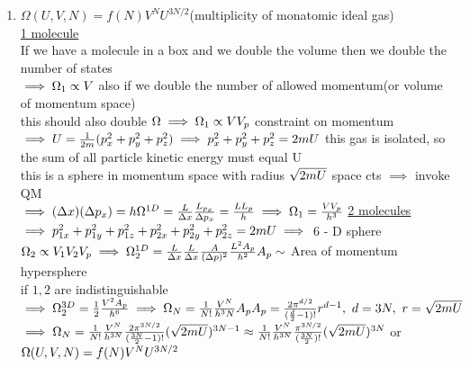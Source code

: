 \documentclass[12pt]{amsart}
\begin{document}
\begin{enumerate}
\item \underline{$\Omega(U, V, N) = f(N) V^N U^{3N/2}$}(multiplicity of monatomic ideal gas)\\
\underline{1 molecule}\\
If we have a molecule in a box and we double the volume then we double the number of states \\
$\implies \Omega_1 \propto V\\$
also if we double the number of allowed momentum(or volume of momentum space)\\
this should also double $\Omega\\
\implies \Omega_1 \propto V V_p\\$
constraint on momentum\\
$\implies U = \frac{1}{2m} (p_x^2 + p_y^2 + p_z^2) \implies p_x^2 + p_y^2 + p_z^2 = 2m U\\$
this gas is isolated, so the sum of all particle kinetic energy must equal U\\
this is a sphere in momentum space with radius $\sqrt{2m U}\\$
space cts $\implies$ invoke QM\\
$\implies (\Delta x)(\Delta p_x) = h\\
\Omega^{1D} = \frac{L}{\Delta x} \frac{L_{p_x}}{\Delta p_x} = \frac{L L_p}{h}\\
\implies \Omega_1 = \frac{V V_p}{h^3}\\$
\underline{2 molecules}\\
$\implies p_{1x}^2 + p_{1y}^2 + p_{1z}^2 + p_{2x}^2 + p_{2y}^2 + p_{2z}^2 = 2 m U\\
\implies$ 6 - D sphere\\
$\Omega_2 \propto V_1 V_2 V_p \implies \Omega_2^{1 D} = \frac{L}{\Delta x} \frac{L}{\Delta x} \frac{A}{(\Delta p)^2} \frac{L^2 A_p}{h^2}\\
A_p \sim$ Area of momentum hypersphere\\
if $1,2$ are indistinguishable\\
$\implies \Omega_2^{3D} = \frac{1}{2} \frac{V^2 A_p}{h^6}\\
\implies \Omega_N = \frac{1}{N!} \frac{V^N}{h^3N} A_p\\
A_p = \frac{2 \pi^{d/2}}{(\frac{d}{2} -1)!} r^{d-1},\,\, d=3N,\,\, r = \sqrt{2 m U}\\$
$\implies \Omega_N = \frac{1}{N!} \frac{V^N}{h^{3N} }\frac{2 \pi^{3N/2}}{( \frac{3 N}{2} - 1)!} ( \sqrt{2m U})^{3 N -1}\\
\approx \frac{1}{N!} \frac{V^N}{h^{3N}} \frac{ \pi^{3N/2}}{(\frac{3 N}{2})!} ( \sqrt{2m U})^{3N}\\$
or \\
$\Omega(U, V, N) = f(N) V^N U^{3N/2}\\$



\end{enumerate}
\end{document}
